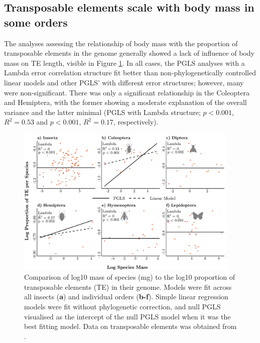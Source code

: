 \documentclass[11pt]{article}
\begin{document}
\vspace{1cm}
\subsection{Transposable elements scale with body mass in some orders}
The analyses assessing the relationship of body mass with the proportion of transposable elements in the genome generally showed a lack of influence of body mass on TE length, visible in Figure \ref{fig:te-mass-figure}. In all cases, the PGLS analyses with a Lambda error correlation structure fit better than non-phylogenetically controlled linear models and other PGLS' with different error structures; however, many were non-significant. There was only a significant relationship in the Coleoptera and Hemiptera, with the former showing a moderate explanation of the overall variance and the latter minimal (PGLS with Lambda structure; $p<0.001$, $R^2 = 0.53$ and $p<0.001$, $R^2 = 0.17$, respectively).

\vspace{1.5cm}
\begin{figure}[!h]
\centering
    \includegraphics[width=0.95\textwidth]{figures/TE_mass_orange.pdf}
    \caption{Comparison of log10 mass of species (mg) to the log10 proportion of transposable elements (TE) in their genome. Models were fit across all insects (\textbf{a}) and individual orders (\textbf{b-f}). Simple linear regression models were fit without phylogenetic correction, and null PGLS visualised as the intercept of the null PGLS model when it was the best fitting model. Data on transposable elements was obtained from \cite{600TEs}.}
    \label{fig:te-mass-figure}
\end{figure}
\justifying
\end{document}
